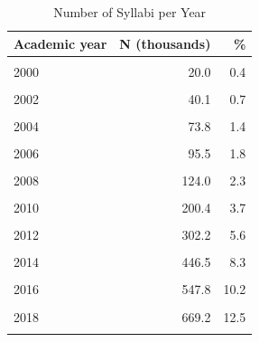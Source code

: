 \documentclass[
  12pt,
]{article}
\begin{document}
\begin{table}[!h]
\centering
\caption{\label{tab:SI-years}Number of Syllabi per Year}
\centering
\fontsize{10}{12}\selectfont
\begin{tabular}[t]{lrr}
\toprule
Academic year & N (thousands) & \%\\
\midrule
\cellcolor{gray!10}{1999 or older} & \cellcolor{gray!10}{40.5} & \cellcolor{gray!10}{0.8}\\
2000 & 20.0 & 0.4\\
\cellcolor{gray!10}{2001} & \cellcolor{gray!10}{27.2} & \cellcolor{gray!10}{0.5}\\
2002 & 40.1 & 0.7\\
\cellcolor{gray!10}{2003} & \cellcolor{gray!10}{55.1} & \cellcolor{gray!10}{1.0}\\
2004 & 73.8 & 1.4\\
\cellcolor{gray!10}{2005} & \cellcolor{gray!10}{77.2} & \cellcolor{gray!10}{1.4}\\
2006 & 95.5 & 1.8\\
\cellcolor{gray!10}{2007} & \cellcolor{gray!10}{100.6} & \cellcolor{gray!10}{1.9}\\
2008 & 124.0 & 2.3\\
\cellcolor{gray!10}{2009} & \cellcolor{gray!10}{153.0} & \cellcolor{gray!10}{2.8}\\
2010 & 200.4 & 3.7\\
\cellcolor{gray!10}{2011} & \cellcolor{gray!10}{256.3} & \cellcolor{gray!10}{4.8}\\
2012 & 302.2 & 5.6\\
\cellcolor{gray!10}{2013} & \cellcolor{gray!10}{375.3} & \cellcolor{gray!10}{7.0}\\
2014 & 446.5 & 8.3\\
\cellcolor{gray!10}{2015} & \cellcolor{gray!10}{464.6} & \cellcolor{gray!10}{8.6}\\
2016 & 547.8 & 10.2\\
\cellcolor{gray!10}{2017} & \cellcolor{gray!10}{658.5} & \cellcolor{gray!10}{12.3}\\
2018 & 669.2 & 12.5\\
\cellcolor{gray!10}{2019} & \cellcolor{gray!10}{647.0} & \cellcolor{gray!10}{12.0}\\
\bottomrule
\end{tabular}
\end{table}
\end{document}
